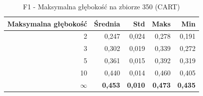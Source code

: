 \begin{table}[htbp]
\centering
\small
\setlength{\tabcolsep}{6pt}
\renewcommand{\arraystretch}{1.2}
\caption{F1 - Maksymalna głębokość na zbiorze 350 (CART)}
\label{tab:CART_max_depth_350_f1}
\begin{tabular}{r|r|r|r|r}
\toprule
Maksymalna głębokość & Średnia & Std & Maks & Min \\
\hline
2 & 0,247 & 0,024 & 0,278 & 0,191 \\
3 & 0,302 & 0,019 & 0,339 & 0,272 \\
5 & 0,361 & 0,015 & 0,392 & 0,319 \\
10 & 0,440 & 0,014 & 0,460 & 0,405 \\
\textbf{$\infty$} & \textbf{0,453} & \textbf{0,010} & \textbf{0,473} & \textbf{0,435} \\
\bottomrule
\end{tabular}
\end{table}